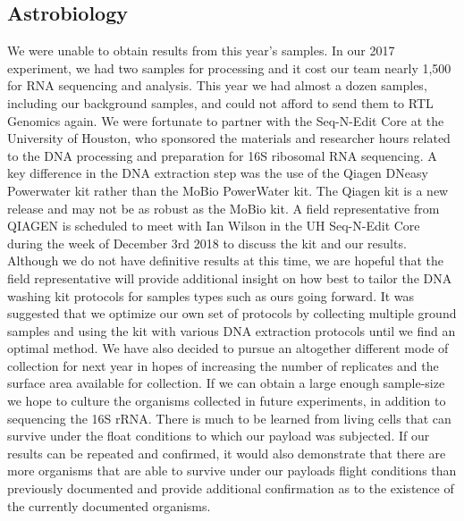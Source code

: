 \subsection{Astrobiology}
\label{sec:Astrobiology Results Discussion}
We were unable to obtain results from this year’s samples. In our 2017 experiment, we had two samples for processing and it cost our team nearly 1,500 for RNA sequencing and analysis. This year we had almost a dozen samples, including our background samples, and could not afford to send them to RTL Genomics again. We were fortunate to partner with the Seq-N-Edit Core at the University of Houston, who sponsored the materials and researcher hours related to the DNA processing and preparation for 16S ribosomal RNA sequencing. A key difference in the DNA extraction step was the use of the Qiagen DNeasy Powerwater kit rather than the MoBio PowerWater kit. The Qiagen kit is a new release and may not be as robust as the MoBio kit. A field representative from QIAGEN is scheduled to meet with Ian Wilson in the UH Seq-N-Edit Core during the week of December 3rd 2018 to discuss the kit and our results. Although we do not have definitive results at this time, we are hopeful that the field representative will provide additional insight on how best to tailor the DNA washing kit protocols for samples types such as ours going forward. It was suggested that we optimize our own set of protocols by collecting multiple ground samples and using the kit with various DNA extraction protocols until we find an optimal method. We have also decided to pursue an altogether different mode of collection for next year in hopes of increasing the number of replicates and the surface area available for collection. If we can obtain a large enough sample-size we hope to culture the organisms collected in future experiments, in addition to sequencing the 16S rRNA. There is much to be learned from living cells that can survive under the float conditions to which our payload was subjected. If our results can be repeated and confirmed, it would also demonstrate that there are more organisms that are able to survive under our payloads flight conditions than previously documented and provide additional confirmation as to the existence of the currently documented organisms.
